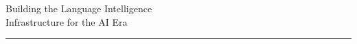 \begin{frame}[plain]
\vspace*{1.05cm}
\par
\vspace{0.22cm}
\vspace{0.34cm}
{\SBFontTitle\fontsize{18}{22}\selectfont\color{SBText}
Building the Language Intelligence\\[0.10cm]
Infrastructure for the AI Era
}\par
\vspace{0.68cm}
{\color{SBPrimary}\rule{3.2cm}{1.6pt}}\par
\vfill
\SBFixedFooter
\end{frame}

